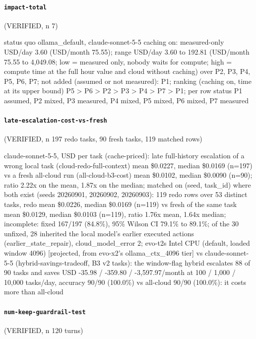\paragraph{\texttt{impact-total}} (VERIFIED, n 7)

{\footnotesize\raggedright status quo ollama\_default, claude-sonnet-5-5 caching on: measured-only USD/day 3.60 (USD/month 75.55); range USD/day 3.60 to 192.81 (USD/month 75.55 to 4,049.08; low = measured only, nobody waits for compute; high = compute time at the full hour value and cloud without caching) over P2, P3, P4, P5, P6, P7; not added (assumed or not measured): P1; ranking (caching on, time at its upper bound) P5 \textgreater{} P6 \textgreater{} P2 \textgreater{} P3 \textgreater{} P4 \textgreater{} P7 \textgreater{} P1; per row status P1 assumed, P2 mixed, P3 measured, P4 mixed, P5 mixed, P6 mixed, P7 measured\par}

\paragraph{\texttt{late-escalation-cost-vs-fresh}} (VERIFIED, n 197 redo tasks, 90 fresh tasks, 119 matched rows)

{\footnotesize\raggedright claude-sonnet-5-5, USD per task (cache-priced): late full-history escalation of a wrong local task (cloud-redo-full-context) mean \$0.0227, median \$0.0169 (n=197) vs a fresh all-cloud run (all-cloud-b3-cost) mean \$0.0102, median \$0.0090 (n=90); ratio 2.22x on the mean, 1.87x on the median; matched on (seed, task\_id) where both exist (seeds 20260901, 20260902, 20260903): 119 redo rows over 53 distinct tasks, redo mean \$0.0226, median \$0.0169 (n=119) vs fresh of the same task mean \$0.0129, median \$0.0103 (n=119), ratio 1.76x mean, 1.64x median; incomplete: fixed 167/197 (84.8\%), 95\% Wilson CI 79.1\% to 89.1\%; of the 30 unfixed, 28 inherited the local model's earlier executed actions (earlier\_state\_repair), cloud\_model\_error 2; evo-t2s Intel CPU (default, loaded window 4096) [projected, from evo-x2's ollama\_ctx\_4096 tier] vs claude-sonnet-5-5 (hybrid-savings-tradeoff, B3 v2 tasks): the window-flag hybrid escalates 88 of 90 tasks and saves USD -35.98 / -359.80 / -3,597.97/month at 100 / 1,000 / 10,000 tasks/day, accuracy 90/90 (100.0\%) vs all-cloud 90/90 (100.0\%): it costs more than all-cloud\par}

\paragraph{\texttt{num-keep-guardrail-test}} (VERIFIED, n 120 turns)

